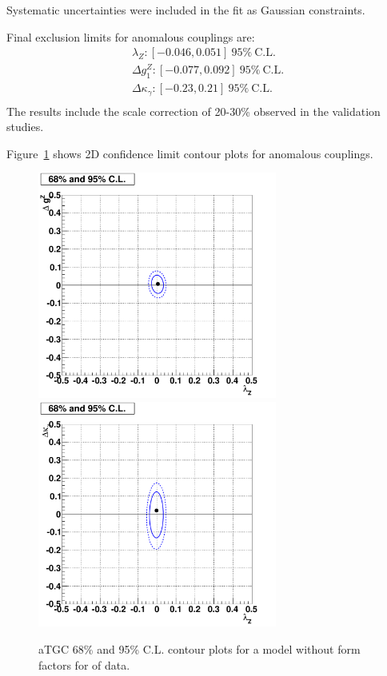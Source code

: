 

Systematic uncertainties were included in the fit as Gaussian
constraints.

Final exclusion limits for anomalous couplings are:
\begin{align}
  \lambda_{Z}: [-0.046,0.051]~95\%~\mathrm{C.L.}\\ 
  \Delta g^{Z}_1: [-0.077,0.092]~95\%~\mathrm{C.L.}\\
  \Delta\kappa_\gamma: [-0.23,0.21]~95\%~\mathrm{C.L.}\\
\end{align}
The results include the scale correction of 20-30\% observed in the validation studies.

Figure~\ref{fig:contour} shows 2D confidence limit contour plots for
anomalous couplings.

\begin{figure}[tp]
  \centering
    \includegraphics[width=0.7\textwidth]{figures/lz_dgz_contourplot}
    \includegraphics[width=0.7\textwidth]{figures/lz_dkg_contourplot}
  

  \caption[Contour plots for data] {aTGC 68\% and 95\% C.L. contour
    plots for a model without form factors for \intlumi of data.}
  \label{fig:contour}
\end{figure}

